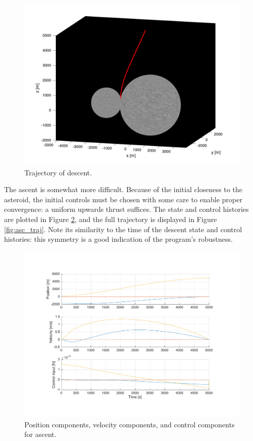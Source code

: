 \documentclass{article}
\begin{document}
\begin{multicols}{2}
\begin{figure}[H]
	\center
	\includegraphics[width=0.85\linewidth]{figs/desc_traj}
	\caption{Trajectory of descent.}
	\label{fig:desc_traj}
\end{figure}

The ascent is somewhat more difficult. Because of the initial closeness to the asteroid, the initial controls must be chosen with some care to enable proper convergence: a uniform upwards thrust suffices. The state and control histories are plotted in Figure \ref{fig:asc_plots}, and the full trajectory is displayed in Figure \ref{fig:asc_traj}. Note its similarity to the time of the descent state and control histories: this symmetry is a good indication of the program's robustness. 

\begin{figure}[H]
	\center
	\includegraphics[width=0.85\linewidth]{figs/asc_plots_good}
	\caption{Position components, velocity components, and control components for ascent.}
	\label{fig:asc_plots}
\end{figure}


\end{multicols}
\end{document}
